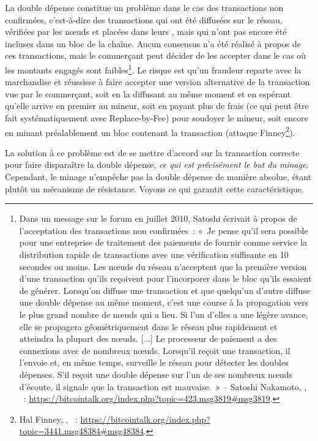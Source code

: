 La double dépense constitue un problème dans le cas des transactions non confirmées, c'est-à-dire des transactions qui ont été diffusées sur le réseau, vérifiées par les nœuds et placées dans leurs , mais qui n'ont pas encore été incluses dans un bloc de la chaîne. Aucun consensus n'a été réalisé à propos de ces transactions, mais le commerçant peut décider de les accepter dans le cas où les montants engagés sont faibles\footnote{Dans un message sur le forum en juillet 2010, Satoshi écrivait à propos de l'acceptation des transactions non confirmées~: «~Je pense qu'il sera possible pour une entreprise de traitement des paiements de fournir comme service la distribution rapide de transactions avec une vérification suffisante en 10 secondes ou moins. Les nœuds du réseau n'acceptent que la première version d'une transaction qu'ils reçoivent pour l'incorporer dans le bloc qu'ils essaient de générer. Lorsqu'on diffuse une transaction et que quelqu'un d'autre diffuse une double dépense au même moment, c'est une course à la propagation vers le plus grand nombre de nœuds qui a lieu. Si l'un d'elles a une légère avance, elle se propagera géométriquement dans le réseau plus rapidement et atteindra la plupart des nœuds. [...] Le processeur de paiement a des connexions avec de nombreux nœuds. Lorsqu'il reçoit une transaction, il l'envoie et, en même temps, surveille le réseau pour détecter les doubles dépenses. S'il reçoit une double dépense sur l'un de ses nombreux nœuds d'écoute, il signale que la transaction est mauvaise.~» -- Satoshi Nakamoto, , ~: \url{https://bitcointalk.org/index.php?topic=423.msg3819\#msg3819}.}. Le risque est qu'un fraudeur reparte avec la marchandise et réussisse à faire accepter une version alternative de la transaction vue par le commerçant, soit en la diffusant au même moment et en espérant qu'elle arrive en premier au mineur, soit en payant plus de frais (ce qui peut être fait systématiquement avec Replace-by-Fee) pour soudoyer le mineur, soit encore en minant préalablement un bloc contenant la transaction (attaque Finney\footnote{Hal Finney, , ~: \url{https://bitcointalk.org/index.php?topic=3441.msg48384\#msg48384}.}).

La solution à ce problème est de se mettre d'accord sur la transaction correcte pour faire disparaître la double dépense, \emph{ce qui est précisément le but du minage}. Cependant, le minage n'empêche pas la double dépense de manière absolue, étant plutôt un mécanisme de résistance. Voyons ce qui garantit cette caractéristique.

